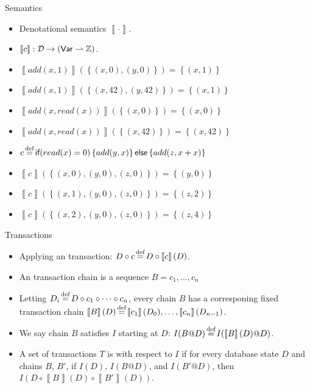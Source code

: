 \documentclass[xcolor={dvipsnames,svgnames,table}]{beamer}
\newcommand{\defeq}{\stackrel{\mathclap{\normalfont\mbox{\scriptsize def}}}{=}}
\newcommand{\denote}[1]{\left\llbracket#1\right\rrbracket}
\newcommand{\set}[1]{\left\{#1\right\}}
\begin{document}
\begin{frame}{\imp{} Semantics}
  \begin{itemize}
    \item Denotational semantics $\denote{\cdot}$.
    \item $\denote{c}: \dbs \to (\var \rightharpoonup \ints)$.
    \item $\denote{add(x, 1)}(\set{(x, 0), (y, 0)}) = \set{(x, 1)}$
    \item $\denote{add(x, 1)}(\set{(x, 42), (y, 42)}) = \set{(x, 1)}$
    \item $\denote{add(x, read(x))}(\set{(x, 0)}) = \set{(x, 0)}$
    \item $\denote{add(x, read(x))}(\set{(x, 42)}) = \set{(x, 42)}$
    \item $c \defeq \impif{read(x)=0}{add(y, x)}{add(z, x + x)}$
    \item $\denote{c}(\set{(x, 0), (y, 0), (z, 0)}) = \set{(y, 0)}$
    \item $\denote{c}(\set{(x, 1), (y, 0), (z, 0)}) = \set{(z, 2)}$
    \item $\denote{c}(\set{(x, 2), (y, 0), (z, 0)}) = \set{(z, 4)}$
  \end{itemize}
\end{frame}

\begin{frame}{\imp{} Transactions}
  \begin{itemize}
    \item
      Applying an \imp{} transaction: $D \circ c \defeq D \circ \denote{c}(D)$.
    \item
      An \imp{} transaction chain is a sequence $B = c_1, \ldots, c_n$
    \item
      Letting $D_i \defeq D \circ c_1 \circ \cdots \circ c_n$, every \imp{}
      chain $B$ has a corresponing fixed transaction chain $\denote{B}(D)
      \defeq \denote{c_1}(D_0), \ldots, \denote{c_n}(D_{n-1})$.
    \item
      We say \imp{} chain $B$ satisfies $I$ starting at $D$: $I(B@D) \defeq
      I(\denote{B}(D) @ D)$.
    \item
      A set of \imp{} transactions $T$ is \emph{\iconfluent{}} with respect to
      $I$ if for every database state $D$ and \imp{} chains $B$, $B'$, if
      $I(D)$, $I(B@D)$, and $I(B'@D)$, then $I(D \circ \denote{B}(D) \circ
      \denote{B'}(D))$.
  \end{itemize}
\end{frame}
\end{document}
